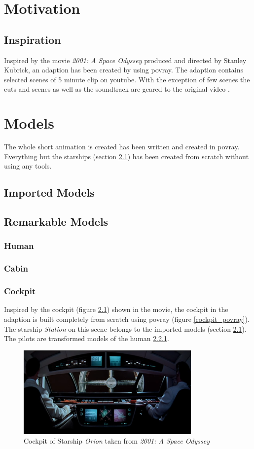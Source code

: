 
\chapter{Motivation}
\section{Inspiration}
Inspired by the movie \textit{2001: A Space Odyssey} produced and directed by Stanley Kubrick, an adaption has been created by using povray. The adaption contains selected scenes of 5 minute clip on youtube.  With the exception of few scenes the cuts and scenes as well as the soundtrack are geared to the original video  \cite{EbClectic}.

\chapter{Models}
The whole short animation is created has been written and created in povray. Everything but the starships (section \ref{imported_models}) has been created from scratch without using any tools.

\section{Imported Models} \label{imported_models}
\section{Remarkable Models}
\subsection{Human} \label{human_model}
\subsection{Cabin} 
\newpage
\subsection{Cockpit} \label{cockpit_model}
Inspired by the cockpit (figure \ref{cockpit_original}) shown in the movie, the cockpit in the adaption  is built completely from scratch using povray (figure \ref{cockpit_povray}). The starship \textit{Station} on this scene belongs to the imported models (section \ref{imported_models}). 
The pilots are transformed models of the human \ref{human_model}. 
\begin{figure}[ht]
	\centering
	\includegraphics[width=0.8\textwidth]{images/original_cockpit_scene19.png}
	\caption{Cockpit of Starship \textit{Orion} taken from \textit{2001: A Space Odyssey}}
	\label{cockpit_original}
\end{figure}

